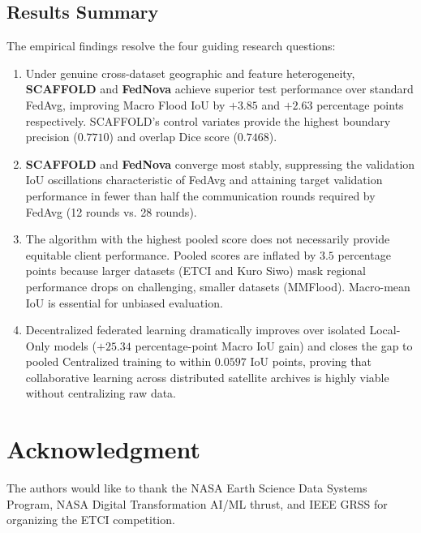 \documentclass[conference]{IEEEtran}
\begin{document}
\subsection{Results Summary}
The empirical findings resolve the four guiding research questions:
\begin{enumerate}
    \item[\textbf{RQ1:}] Under genuine cross-dataset geographic and feature heterogeneity, \textbf{SCAFFOLD} and \textbf{FedNova} achieve superior test performance over standard FedAvg, improving Macro Flood IoU by $+3.85$ and $+2.63$ percentage points respectively. SCAFFOLD's control variates provide the highest boundary precision ($0.7710$) and overlap Dice score ($0.7468$).
    \item[\textbf{RQ2:}] \textbf{SCAFFOLD} and \textbf{FedNova} converge most stably, suppressing the validation IoU oscillations characteristic of FedAvg and attaining target validation performance in fewer than half the communication rounds required by FedAvg (12 rounds vs. 28 rounds).
    \item[\textbf{RQ3:}] The algorithm with the highest pooled score does not necessarily provide equitable client performance. Pooled scores are inflated by $3.5$ percentage points because larger datasets (ETCI and Kuro Siwo) mask regional performance drops on challenging, smaller datasets (MMFlood). Macro-mean IoU is essential for unbiased evaluation.
    \item[\textbf{RQ4:}] Decentralized federated learning dramatically improves over isolated Local-Only models ($+25.34$ percentage-point Macro IoU gain) and closes the gap to pooled Centralized training to within $0.0597$ IoU points, proving that collaborative learning across distributed satellite archives is highly viable without centralizing raw data.
\end{enumerate}

\section*{Acknowledgment}
The authors would like to thank the NASA Earth Science Data Systems Program, NASA Digital Transformation AI/ML thrust, and IEEE GRSS for organizing the ETCI competition.
\end{document}
